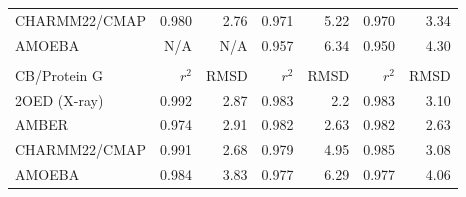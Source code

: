 \begin{table}[h]
\begin{center}
\begin{threeparttable}
\begin{tabular}{l r r r r r r}
CHARMM22/CMAP  & 0.980  & 2.76  &  0.971   &5.22  &  0.970   &3.34\\
AMOEBA         & N/A    & N/A   &  0.957   &6.34  &  0.950   &4.30\\
 &&&&&&\\
CB/Protein G   & $r^2$  & RMSD  &  $r^2$   &RMSD  &  $r^2$   &RMSD\\\hline
2OED (X-ray)   & 0.992  & 2.87  &  0.983   &2.2   &  0.983   &3.10\\
AMBER          & 0.974  & 2.91  &  0.982   &2.63  &  0.982   &2.63\\
CHARMM22/CMAP  & 0.991  & 2.68  &  0.979   &4.95  &  0.985   &3.08\\
AMOEBA         & 0.984  & 3.83  &  0.977   &6.29  &  0.977   &4.06\\
    \end{tabular}
    \end{threeparttable}
    \end{center}
    \label{tab:procs_results}
\end{table}






